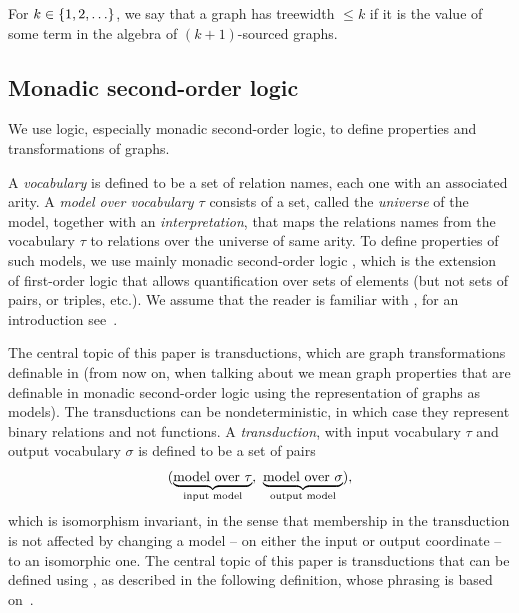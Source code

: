   \begin{definition}[Treewidth]
        For $k \in \{1,2,\ldots\}$, we say that a  graph has treewidth  $\le  k$ if it is the value of some term in the algebra of $(k+1)$-sourced graphs.
    \end{definition}

  
    

    \subsection{Monadic second-order logic}
    We  use logic, especially monadic second-order logic, to define properties and transformations of graphs. 

    A  \emph{vocabulary} is defined to be  a set of relation names, each one with an associated arity. A \emph{model over vocabulary $\tau$} consists of a set, called the \emph{universe} of the model, together with an \emph{interpretation}, that maps the relations names from the vocabulary $\tau$ to  relations over the universe of same arity. To define properties of such models, we use mainly monadic second-order logic \mso, which  is the extension of first-order logic that allows quantification over sets of elements (but not sets of pairs, or triples, etc.). We assume that the reader is familiar with \mso, for an introduction see~\cite[Section 2]{Thomas97}.
     
     

  The central topic of this paper is \mso transductions, which are graph transformations definable in \mso (from now on, when talking about \mso we mean graph properties that are definable in monadic second-order logic using the \msotwo representation of graphs as models). The transductions can be nondeterministic, in which case they represent binary relations and not functions.
A \emph{transduction}, with input vocabulary $\tau$ and output vocabulary $\sigma$ is defined to be a set of pairs 
\begin{align*}
    (\myunderbrace{\text{model over $\tau$}}{input model}, \ 
    \myunderbrace{\text{model over $\sigma$}}{output model}),
\end{align*}
which is isomorphism invariant, in the sense that membership in the transduction is not affected by changing a model -- on either the input or output coordinate -- to an isomorphic one. The central topic of this paper is transductions that can be defined using \mso, as described in the following definition, whose phrasing is based on~\cite[p.~9--10]{bojanczykOptimizingTreeDecompositions2017a}. 

